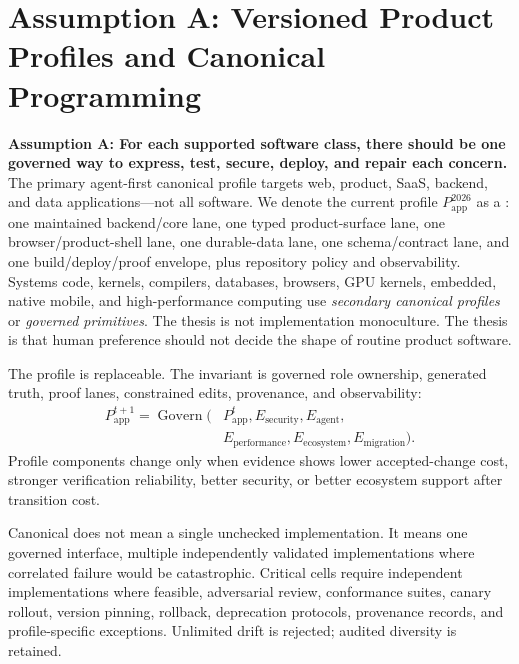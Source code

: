 \section{Assumption A: Versioned Product Profiles and Canonical Programming}

\textbf{Assumption A: For each supported software class, there should be one governed way to express, test, secure, deploy, and repair each concern.} The primary agent-first canonical profile targets web, product, SaaS, backend, and data applications---not all software. We denote the current profile $P_{\mathrm{app}}^{2026}$ as a \canonprofile{}: one maintained backend/core lane, one typed product-surface lane, one browser/product-shell lane, one durable-data lane, one schema/contract lane, and one build/deploy/proof envelope, plus repository policy and observability. Systems code, kernels, compilers, databases, browsers, GPU kernels, embedded, native mobile, and high-performance computing use \emph{secondary canonical profiles} or \emph{governed primitives}. The thesis is not implementation monoculture. The thesis is that human preference should not decide the shape of routine product software.

The profile is replaceable. The invariant is governed role ownership, generated truth, proof lanes, constrained edits, provenance, and observability:
\begin{equation}
\begin{aligned}
P_{\mathrm{app}}^{t+1} =
\operatorname{Govern}(&P_{\mathrm{app}}^{t}, E_{\mathrm{security}}, E_{\mathrm{agent}},\\
&E_{\mathrm{performance}}, E_{\mathrm{ecosystem}}, E_{\mathrm{migration}}).
\end{aligned}
\end{equation}
Profile components change only when evidence shows lower accepted-change cost, stronger verification reliability, better security, or better ecosystem support after transition cost.

Canonical does not mean a single unchecked implementation. It means one governed interface, multiple independently validated implementations where correlated failure would be catastrophic. Critical cells require independent implementations where feasible, adversarial review, conformance suites, canary rollout, version pinning, rollback, deprecation protocols, provenance records, and profile-specific exceptions. Unlimited drift is rejected; audited diversity is retained.

